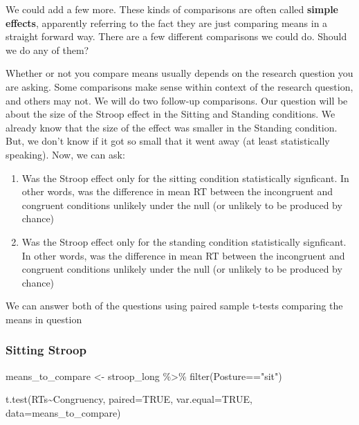 \documentclass[
]{book}
\newenvironment{Shaded}{\begin{snugshade}}{\end{snugshade}}
\newcommand{\AttributeTok}[1]{\textcolor[rgb]{0.77,0.63,0.00}{#1}}
\newcommand{\ConstantTok}[1]{\textcolor[rgb]{0.00,0.00,0.00}{#1}}
\newcommand{\FunctionTok}[1]{\textcolor[rgb]{0.00,0.00,0.00}{#1}}
\newcommand{\NormalTok}[1]{#1}
\newcommand{\OtherTok}[1]{\textcolor[rgb]{0.56,0.35,0.01}{#1}}
\newcommand{\SpecialCharTok}[1]{\textcolor[rgb]{0.00,0.00,0.00}{#1}}
\newcommand{\StringTok}[1]{\textcolor[rgb]{0.31,0.60,0.02}{#1}}
\begin{document}
We could add a few more. These kinds of comparisons are often called \textbf{simple effects}, apparently referring to the fact they are just comparing means in a straight forward way. There are a few different comparisons we could do. Should we do any of them?

Whether or not you compare means usually depends on the research question you are asking. Some comparisons make sense within context of the research question, and others may not. We will do two follow-up comparisons. Our question will be about the size of the Stroop effect in the Sitting and Standing conditions. We already know that the size of the effect was smaller in the Standing condition. But, we don't know if it got so small that it went away (at least statistically speaking). Now, we can ask:

\begin{enumerate}
\def\labelenumi{\arabic{enumi}.}
\item
  Was the Stroop effect only for the sitting condition statistically signficant. In other words, was the difference in mean RT between the incongruent and congruent conditions unlikely under the null (or unlikely to be produced by chance)
\item
  Was the Stroop effect only for the standing condition statistically signficant. In other words, was the difference in mean RT between the incongruent and congruent conditions unlikely under the null (or unlikely to be produced by chance)
\end{enumerate}

We can answer both of the questions using paired sample t-tests comparing the means in question

\hypertarget{sitting-stroop}{%
\subsubsection{Sitting Stroop}\label{sitting-stroop}}

\begin{Shaded}
\begin{Highlighting}[]
\NormalTok{means\_to\_compare }\OtherTok{\textless{}{-}}\NormalTok{ stroop\_long }\SpecialCharTok{\%\textgreater{}\%}
                      \FunctionTok{filter}\NormalTok{(Posture}\SpecialCharTok{==}\StringTok{"sit"}\NormalTok{)}

\FunctionTok{t.test}\NormalTok{(RTs}\SpecialCharTok{\textasciitilde{}}\NormalTok{Congruency, }\AttributeTok{paired=}\ConstantTok{TRUE}\NormalTok{, }\AttributeTok{var.equal=}\ConstantTok{TRUE}\NormalTok{, }\AttributeTok{data=}\NormalTok{means\_to\_compare)}
\end{Highlighting}
\end{Shaded}
\end{document}
